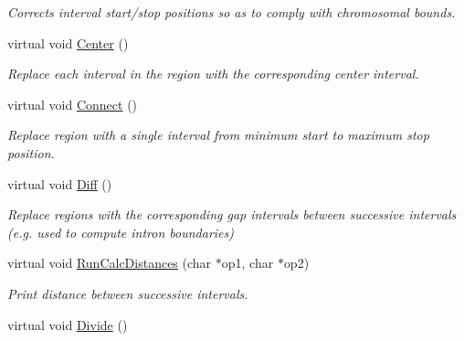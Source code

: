 \begin{DoxyCompactItemize}
\begin{DoxyCompactList}\small\item\em Corrects interval start/stop positions so as to comply with chromosomal bounds. \end{DoxyCompactList}\item 
\hypertarget{classGenomicRegion_a1e9a85a086afbe2608411450c9a4c5e6}{
virtual void \hyperlink{classGenomicRegion_a1e9a85a086afbe2608411450c9a4c5e6}{Center} ()}
\label{classGenomicRegion_a1e9a85a086afbe2608411450c9a4c5e6}

\begin{DoxyCompactList}\small\item\em Replace each interval in the region with the corresponding center interval. \end{DoxyCompactList}\item 
\hypertarget{classGenomicRegion_ac2c426782bd7c0d302b7a77bb1ff047f}{
virtual void \hyperlink{classGenomicRegion_ac2c426782bd7c0d302b7a77bb1ff047f}{Connect} ()}
\label{classGenomicRegion_ac2c426782bd7c0d302b7a77bb1ff047f}

\begin{DoxyCompactList}\small\item\em Replace region with a single interval from minimum start to maximum stop position. \end{DoxyCompactList}\item 
\hypertarget{classGenomicRegion_a869de97ecf059355fe5a5b572b5c2575}{
virtual void \hyperlink{classGenomicRegion_a869de97ecf059355fe5a5b572b5c2575}{Diff} ()}
\label{classGenomicRegion_a869de97ecf059355fe5a5b572b5c2575}

\begin{DoxyCompactList}\small\item\em Replace regions with the corresponding gap intervals between successive intervals (e.g. used to compute intron boundaries) \end{DoxyCompactList}\item 
\hypertarget{classGenomicRegion_a98695d5d1056d693a1c635b197f4b8bf}{
virtual void \hyperlink{classGenomicRegion_a98695d5d1056d693a1c635b197f4b8bf}{RunCalcDistances} (char $\ast$op1, char $\ast$op2)}
\label{classGenomicRegion_a98695d5d1056d693a1c635b197f4b8bf}

\begin{DoxyCompactList}\small\item\em Print distance between successive intervals. \end{DoxyCompactList}\item 
\hypertarget{classGenomicRegion_a0785438db56d7b7cc7539470e85434dd}{
virtual void \hyperlink{classGenomicRegion_a0785438db56d7b7cc7539470e85434dd}{Divide} ()}
\label{classGenomicRegion_a0785438db56d7b7cc7539470e85434dd}


\end{DoxyCompactItemize}
